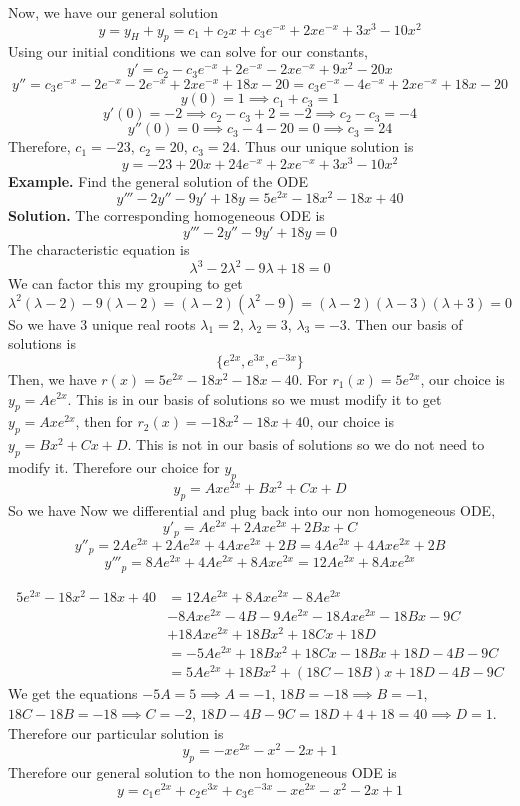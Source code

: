 \documentclass[openany]{report}
\begin{document}
Now, we have our general solution 
\[y = y_H + y_p = c_1 + c_2x + c_3e^{-x} + 2xe^{-x} + 3x^3 - 10x^2\]
Using our initial conditions we can solve for our constants,
\[y' = c_2 - c_3e^{-x} + 2e^{-x} - 2xe^{-x} + 9x^2 - 20x\]
\[y'' = c_3e^{-x} - 2e^{-x} - 2e^{-x} + 2xe^{-x} + 18x - 20 = c_3e^{-x} - 4e^{-x} + 2xe^{-x} + 18x - 20\]
\[y(0) = 1 \implies c_1 + c_3 = 1\]
\[y'(0) = -2 \implies c_2 - c_3 + 2 = -2 \implies c_2 -c_3 = -4\]
\[y''(0) = 0 \implies c_3 - 4 - 20 = 0 \implies c_3 = 24\]
Therefore, $c_1 = -23$, $c_2 = 20$, $c_3 = 24$. Thus our unique solution is
\[y = -23 + 20x + 24e^{-x} + 2xe^{-x} + 3x^3 - 10x^2\]
\textbf{Example.} Find the general solution of the ODE 
\[y''' - 2y'' - 9y' + 18y = 5e^{2x} - 18x^2 - 18x + 40\]
\textbf{Solution.} The corresponding homogeneous ODE is 
\[y''' - 2y'' - 9y' + 18y = 0\]
The characteristic equation is
\[\lambda^3 - 2\lambda^2 - 9\lambda + 18 = 0\]
We can factor this my grouping to get 
\[\lambda^2(\lambda - 2) -9(\lambda-2) = (\lambda-2)(\lambda^2-9) = (\lambda-2)(\lambda -3)(\lambda +3)= 0 \]
So we have 3 unique real roots $\lambda_1 = 2$, $\lambda_2 = 3$, $\lambda_3 = -3$. Then our basis of solutions is
\[\{e^{2x}, e^{3x}, e^{-3x}\}\]
Then, we have $r(x) = 5e^{2x} - 18x^2 - 18x - 40$. For $r_1(x) = 5e^{2x}$, our choice is $y_p = Ae^{2x}$. This is in our basis of solutions so we must modify it to get $y_p = Axe^{2x}$, then for $r_2(x) = -18x^2 - 18x + 40$, our choice is $y_p = Bx^2 + Cx + D$. This is not in our basis of solutions so we do not need to modify it. Therefore our choice for $y_p$ 
\[y_p = Axe^{2x} + Bx^2 + Cx + D\]
So we have 
Now we differential and plug back into our non homogeneous ODE,
\[y'_p = Ae^{2x} + 2Axe^{2x} + 2Bx + C\]
\[y''_p = 2Ae^{2x} + 2Ae^{2x} + 4Axe^{2x} + 2B = 4Ae^{2x} + 4Axe^{2x} + 2B\]
\[y'''_p = 8Ae^{2x} + 4Ae^{2x} + 8Axe^{2x} = 12Ae^{2x} + 8Axe^{2x}\]

\begin{align*}
    5e^{2x} - 18x^2 - 18x + 40 &= 12Ae^{2x} + 8Axe^{2x} - 8Ae^{2x}\\
    &- 8Axe^{2x} - 4B - 9Ae^{2x} - 18Axe^{2x} - 18Bx- 9C\\
    &+ 18Axe^{2x} + 18Bx^2 + 18Cx + 18D\\
    &= -5Ae^{2x} + 18Bx^2 + 18Cx - 18Bx + 18D - 4B - 9C\\
    &= 5Ae^{2x} + 18Bx^2 + (18C - 18B)x + 18D - 4B - 9C
\end{align*}
We get the equations $-5A = 5 \implies A = -1$, $18B = -18 \implies B = -1$, $18C - 18B = -18 \implies C = -2$, $18D - 4B - 9C = 18D + 4 + 18 = 40 \implies D = 1$. Therefore our particular solution is
\[y_p = -xe^{2x} - x^2 - 2x + 1\] 
Therefore our general solution to the non homogeneous ODE is 
\[y = c_1e^{2x} + c_2e^{3x} + c_3e^{-3x} - xe^{2x} - x^2 - 2x + 1\]
\end{document}
